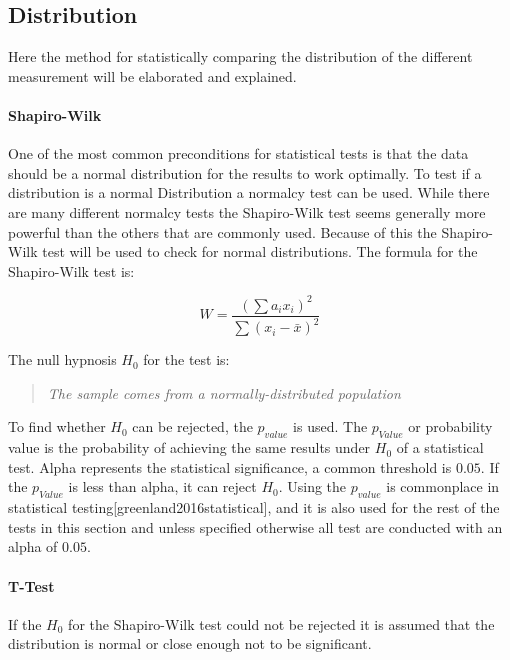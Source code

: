 \subsection{Distribution}
Here the method for statistically comparing the distribution of the different measurement will be elaborated and explained.

\paragraph{Shapiro-Wilk}
One of the most common preconditions for statistical tests is that the data should be a normal distribution for the results to work optimally. To test if a distribution is a normal Distribution a normalcy test can be used. While there are many different normalcy tests the Shapiro-Wilk test seems generally more powerful than the others that are commonly used\cite{razali2011power}. Because of this the Shapiro-Wilk test will be used to check for normal distributions. The formula for the Shapiro-Wilk test is:

\begin{equation}
    W=\frac{( \sum{a_i x_i} )^2}{\sum{(x_i - \bar{x})^2}}
\end{equation}

The null hypnosis $H_0$ for the test is:

\begin{quotation}
    \textit{The sample comes from a normally-distributed population}
\end{quotation}

To find whether $H_0$ can be rejected, the $p_{value}$ is used. The $p_{Value}$ or probability value is the probability of achieving the same results under $H_0$ of a statistical test. Alpha represents the statistical significance, a common threshold is $0.05$. If the $p_{Value}$ is less than alpha, it can reject $H_0$. Using the $p_{value}$ is commonplace in statistical testing[greenland2016statistical], and it is also used for the rest of the tests in this section and unless specified otherwise all test are conducted with an alpha of $0.05$.

\paragraph{T-Test}

If the $H_0$ for the Shapiro-Wilk test could not be rejected it is assumed that the distribution is normal or close enough not to be significant.

